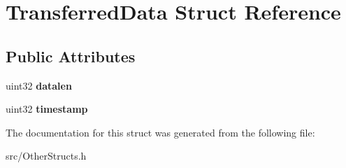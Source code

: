 \section{TransferredData Struct Reference}
\label{structTransferredData}
\subsection*{Public Attributes}
\begin{DoxyCompactItemize}
\item 
uint32 {\bfseries datalen}\label{structTransferredData_ac6d8755f4d2372b6942cc34dcf9b183b}

\item 
uint32 {\bfseries timestamp}\label{structTransferredData_adc6adca44f223099cae0c8dc54cab9b3}

\end{DoxyCompactItemize}


The documentation for this struct was generated from the following file:\begin{DoxyCompactItemize}
\item 
src/OtherStructs.h\end{DoxyCompactItemize}
